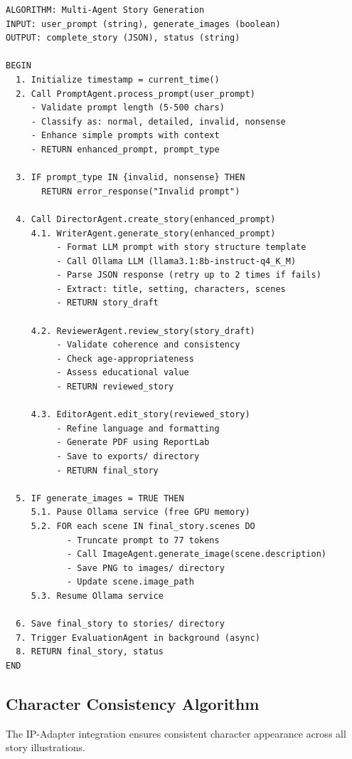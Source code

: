 \begin{verbatim}
ALGORITHM: Multi-Agent Story Generation
INPUT: user_prompt (string), generate_images (boolean)
OUTPUT: complete_story (JSON), status (string)

BEGIN
  1. Initialize timestamp = current_time()
  2. Call PromptAgent.process_prompt(user_prompt)
     - Validate prompt length (5-500 chars)
     - Classify as: normal, detailed, invalid, nonsense
     - Enhance simple prompts with context
     - RETURN enhanced_prompt, prompt_type
  
  3. IF prompt_type IN {invalid, nonsense} THEN
       RETURN error_response("Invalid prompt")
  
  4. Call DirectorAgent.create_story(enhanced_prompt)
     4.1. WriterAgent.generate_story(enhanced_prompt)
          - Format LLM prompt with story structure template
          - Call Ollama LLM (llama3.1:8b-instruct-q4_K_M)
          - Parse JSON response (retry up to 2 times if fails)
          - Extract: title, setting, characters, scenes
          - RETURN story_draft
     
     4.2. ReviewerAgent.review_story(story_draft)
          - Validate coherence and consistency
          - Check age-appropriateness
          - Assess educational value
          - RETURN reviewed_story
     
     4.3. EditorAgent.edit_story(reviewed_story)
          - Refine language and formatting
          - Generate PDF using ReportLab
          - Save to exports/ directory
          - RETURN final_story
  
  5. IF generate_images = TRUE THEN
     5.1. Pause Ollama service (free GPU memory)
     5.2. FOR each scene IN final_story.scenes DO
            - Truncate prompt to 77 tokens
            - Call ImageAgent.generate_image(scene.description)
            - Save PNG to images/ directory
            - Update scene.image_path
     5.3. Resume Ollama service
  
  6. Save final_story to stories/ directory
  7. Trigger EvaluationAgent in background (async)
  8. RETURN final_story, status
END
\end{verbatim}

\subsection{Character Consistency Algorithm}

The IP-Adapter integration ensures consistent character appearance across all story illustrations.

